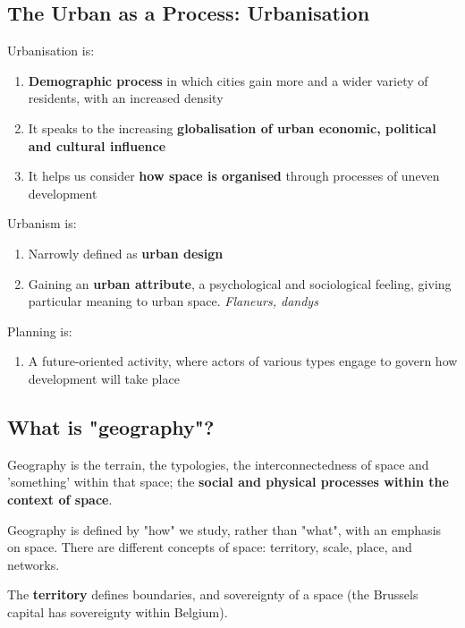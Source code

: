 \documentclass{article}
\begin{document}
\subsection{The Urban as a Process: Urbanisation}

Urbanisation is:

\begin{enumerate}
  \item \textbf{Demographic process} in which cities gain more and a wider variety of residents, with an increased density
  \item It speaks to the increasing \textbf{globalisation of urban economic, political and cultural influence}
  \item It helps us consider \textbf{how space is organised} through processes of uneven development
\end{enumerate}

Urbanism is:

\begin{enumerate}
  \item Narrowly defined as \textbf{urban design}
  \item Gaining an \textbf{urban attribute}, a psychological and sociological feeling, giving particular meaning to urban space. \textit{Flaneurs, dandys}
\end{enumerate}

Planning is:

\begin{enumerate}
  \item A future-oriented activity, where actors of various types engage to govern how development will take place
\end{enumerate}

\subsection{What is "geography"?}

Geography is the terrain, the typologies, the interconnectedness of space and 'something' within that space; the \textbf{social and physical processes within the context of space}.

Geography is defined by "how" we study, rather than "what", with an emphasis on space. There are different concepts of space: territory, scale, place, and networks.

The \textbf{territory} defines boundaries, and sovereignty of a space (the Brussels capital has sovereignty within Belgium). 
\end{document}
